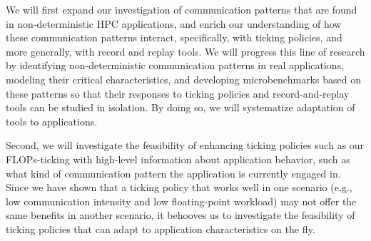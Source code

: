 We will first expand our investigation of communication
patterns that are found in non-deterministic HPC applications, and
enrich our understanding of how these communication patterns interact,
specifically, with ticking policies, and more generally, with record
and replay tools. We will progress this line of research by
identifying non-deterministic communication patterns in real
applications, modeling their critical characteristics, and developing
microbenchmarks based on these patterns so that their responses to
ticking policies and record-and-replay tools can be studied in
isolation. By doing so, we will systematize adaptation of tools to
applications.

Second, we will investigate the feasibility of enhancing ticking
policies such as our FLOPs-ticking with high-level information about
application behavior, such as what kind of communication pattern the
application is currently engaged in. Since we have shown that a
ticking policy that works well in one scenario (e.g., low
communication intensity and low floating-point workload) may not offer
the same benefits in another scenario, it behooves us to investigate
the feasibility of ticking policies that can adapt to application
characteristics on the fly.

